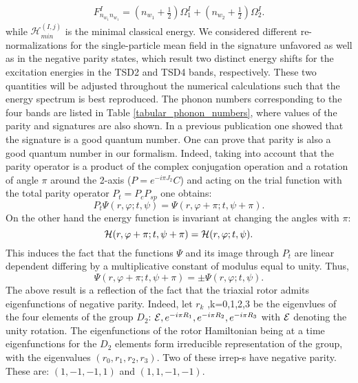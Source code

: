 \documentclass[twocolumn,article,amsmath,amssymb,floatfix,aps]{revtex4}
\begin{document}
\begin{align}
    F_{n_{w_1}n_{w_1}}^I=(n_{w_1}+\frac{1}{2})\Omega_1^I+(n_{w_2}+\frac{1}{2})\Omega_2^I.  \label{phonons}
\end{align}
while $\mathcal{H}^{(I,j)}_{min}$  is the minimal classical energy.  We considered different re-normalizations for the single-particle mean field in the signature unfavored as well as in the negative parity states, which result two distinct energy shifts for the excitation energies in the TSD2 and TSD4 bands, respectively. These two quantities will be adjusted throughout the numerical calculations such that the energy spectrum is best reproduced.  The phonon numbers corresponding to the four bands are listed in Table \ref{tabular_phonon_numbers}, where values of the parity and signatures are also shown. 
In a previous publication \cite{raduta2020new} one showed that the signature is a good quantum number. 
One can  prove that parity is also a good quantum number in our formalism.  Indeed, taking into account that the parity operator is a product of the complex conjugation operation and a rotation of angle $\pi$ around the 2-axis ($P=e^{-i\pi J_2}C$) and acting on the trial function with the total parity operator $P_t=P_cP_{sp}$ one obtains:
\begin{equation}
P_t\Psi(r,\varphi;t,\psi)=\Psi(r,\varphi+\pi; t, \psi +\pi). 
\end{equation}
On the other hand the energy function is invariant at changing the angles with $\pi$:
\begin{equation}
{\cal{H}}(r,\varphi+\pi; t, \psi +\pi)={\cal{H}}(r,\varphi;t,\psi). 
\end{equation}
This induces the fact that the functions $\Psi$ and its image through $P_t$ are linear dependent differing by a multiplicative constant of modulus equal to unity.  Thus,
\begin{equation}
\Psi(r,\varphi+\pi; t, \psi +\pi)=\pm \Psi(r,\varphi;t,\psi). 
\end{equation}
The above result is a reflection of the fact that the triaxial rotor admits eigenfunctions of negative parity.  Indeed, let $r_k$ ,k=0,1,2,3 be the eigenvlues of the four elements of the group $D_2$:
${\cal{E}},e^{-i\pi R_1}, e^{-i\pi R_2}, e^{-i\pi R_3}$ with ${\cal{E}}$ denoting the unity rotation.  The eigenfunctions of the rotor Hamiltonian being at a time  eigenfunctions for the $D_2$ elements form irreducible representation of the group, with the eigenvalues $(r_0,r_1,r_2,r_3)$.  Two of these irrep-s have negative parity.  These are: $(1, -1, -1, 1)$ and $(1, 1, -1, -1)$. 
\end{document}

